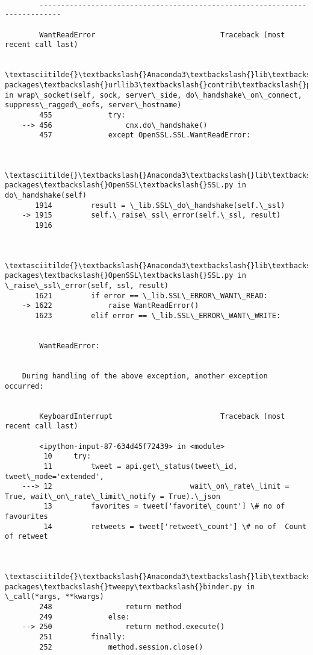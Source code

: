 \documentclass[11pt]{article}
\begin{document}
    \begin{Verbatim}[commandchars=\\\{\}]

        ---------------------------------------------------------------------------

        WantReadError                             Traceback (most recent call last)

        \textasciitilde{}\textbackslash{}Anaconda3\textbackslash{}lib\textbackslash{}site-packages\textbackslash{}urllib3\textbackslash{}contrib\textbackslash{}pyopenssl.py in wrap\_socket(self, sock, server\_side, do\_handshake\_on\_connect, suppress\_ragged\_eofs, server\_hostname)
        455             try:
    --> 456                 cnx.do\_handshake()
        457             except OpenSSL.SSL.WantReadError:
    

        \textasciitilde{}\textbackslash{}Anaconda3\textbackslash{}lib\textbackslash{}site-packages\textbackslash{}OpenSSL\textbackslash{}SSL.py in do\_handshake(self)
       1914         result = \_lib.SSL\_do\_handshake(self.\_ssl)
    -> 1915         self.\_raise\_ssl\_error(self.\_ssl, result)
       1916 
    

        \textasciitilde{}\textbackslash{}Anaconda3\textbackslash{}lib\textbackslash{}site-packages\textbackslash{}OpenSSL\textbackslash{}SSL.py in \_raise\_ssl\_error(self, ssl, result)
       1621         if error == \_lib.SSL\_ERROR\_WANT\_READ:
    -> 1622             raise WantReadError()
       1623         elif error == \_lib.SSL\_ERROR\_WANT\_WRITE:
    

        WantReadError: 

        
    During handling of the above exception, another exception occurred:
    

        KeyboardInterrupt                         Traceback (most recent call last)

        <ipython-input-87-634d45f72439> in <module>
         10     try:
         11         tweet = api.get\_status(tweet\_id, tweet\_mode='extended',
    ---> 12                                wait\_on\_rate\_limit = True, wait\_on\_rate\_limit\_notify = True).\_json 
         13         favorites = tweet['favorite\_count'] \# no of favourites
         14         retweets = tweet['retweet\_count'] \# no of  Count of retweet
    

        \textasciitilde{}\textbackslash{}Anaconda3\textbackslash{}lib\textbackslash{}site-packages\textbackslash{}tweepy\textbackslash{}binder.py in \_call(*args, **kwargs)
        248                 return method
        249             else:
    --> 250                 return method.execute()
        251         finally:
        252             method.session.close()
    


\end{Verbatim}
\end{document}

